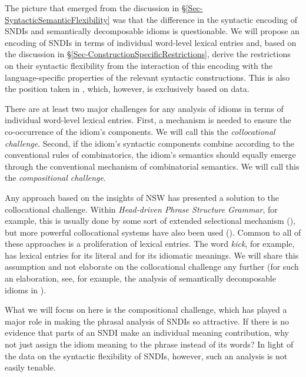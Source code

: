 \documentclass[output=paper]{langsci/langscibook}
\begin{document}
The picture that emerged from the discussion in §\ref{Sec-SyntacticSemanticFlexibility} was that the dif\-ference in the syntactic encoding of SNDIs and  semantically decomposable idioms is questionable. We will propose an encoding of SNDIs in terms of individual word-level lexical entries and, based on the discussion in §\ref{Sec-ConstructionSpecificRestrictions}, derive the restrictions on their syntactic flexibility from the interaction of this encoding with the language-specific properties of the relevant syntactic constructions. This is also the position taken in \cite{kaysagidioms}, which, however, is exclusively based on  data.

There are at least two major challenges for any analysis of idioms in terms of individual word-level lexical entries. First, a mechanism is needed to ensure the co-occurrence of the idiom's components. We will call this the \emph{collocational challenge}. Second, if the idiom's syntactic components combine according to the conventional rules of combinatorics, the idiom's semantics should equally emerge through the conventional mechanism of combinatorial semantics. We will call this the \emph{compositional challenge}.

Any approach based on the insights of NSW has presented a solution to the collocational challenge. Within  \emph{Head-driven Phrase Structure Grammar}, for example, this is usually done by some sort of extended selectional mechanism (\citealt{Krenn:Erbach:94, Soehn:Sailer:03, Sag:07hpsg, kaysagidioms}), but more powerful collocational systems have also been used (\citealt{Riehemann:01,Sailer:diss,Soehn:diss}). Common to all of these approaches is a proliferation of lexical entries. The word \textit{kick}, for example, has lexical entries for its literal and for its idiomatic meanings. We will share this assumption and not elaborate on the collocational challenge any further (for such an elaboration, see, for example, the analysis of  semantically decomposable idioms in \citep{Webelhuth:al:14}).

What we will focus on here is the compositional challenge, which has played a major role in making the phrasal analysis of SNDIs so attractive. If there is no evidence that parts of an SNDI make an individual meaning contribution, why not just assign the idiom meaning to the phrase instead of its words? In light of the data on the syntactic flexibility of SNDIs, however, such an analysis is not easily tenable.
\end{document}
